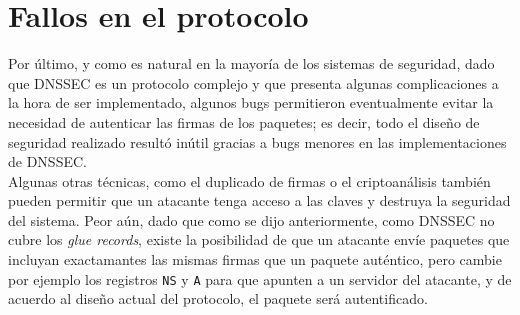 \section{Fallos en el protocolo}
Por \'ultimo, y como es natural en la mayor\'ia de los sistemas de seguridad, dado que DNSSEC es un protocolo complejo y que presenta algunas complicaciones a la hora de ser implementado, algunos bugs permitieron eventualmente evitar la necesidad de autenticar las firmas de los paquetes; es decir, todo el dise\~no de seguridad realizado result\'o in\'util gracias a bugs menores en las implementaciones de DNSSEC.\\
Algunas otras t\'ecnicas, como el duplicado de firmas o el criptoan\'alisis tambi\'en pueden permitir que un atacante tenga acceso a las claves y destruya la seguridad del sistema. Peor a\'un, dado que como se dijo anteriormente, como DNSSEC no cubre los \textit{glue records}, existe la posibilidad de que un atacante env\'ie paquetes que incluyan exactamantes las mismas firmas que un paquete aut\'entico, pero cambie por ejemplo los registros \texttt{NS} y \texttt{A} para que apunten a un servidor del atacante, y de acuerdo al dise\~no actual del protocolo, el paquete ser\'a autentificado.